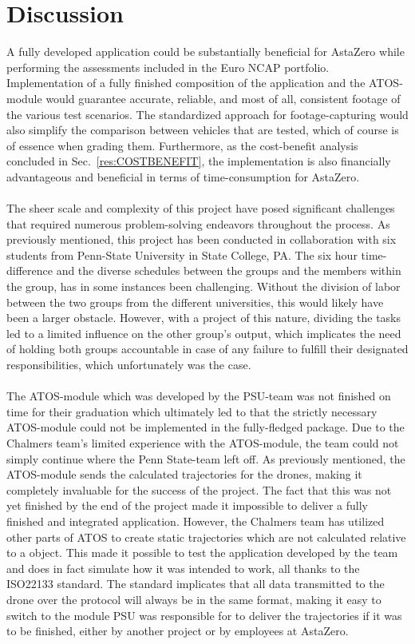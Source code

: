 \chapter{Discussion} \label{sec:discussion}

A fully developed application could be substantially beneficial for AstaZero while performing the assessments included in the Euro NCAP portfolio. Implementation of a fully finished composition of the application and the ATOS-module would guarantee accurate, reliable, and most of all, consistent footage of the various test scenarios. The standardized approach for footage-capturing would also simplify the comparison between vehicles that are tested, which of course is of essence when grading them. Furthermore, as the cost-benefit analysis concluded in Sec.~\ref{res:COSTBENEFIT}, the implementation is also financially advantageous and beneficial in terms of time-consumption for AstaZero. 
\\ \\
The sheer scale and complexity of this project have posed significant challenges that required numerous problem-solving endeavors throughout the process. As previously mentioned, this project has been conducted in collaboration with six students from Penn-State University in State College, PA. The six hour time-difference and the diverse schedules between the groups and the members within the group, has in some instances been challenging. Without the division of labor between the two groups from the different universities, this would likely have been a larger obstacle. However, with a project of this nature, dividing the tasks led to a limited influence on the other group's output, which implicates the need of holding both groups accountable in case of any failure to fulfill their designated responsibilities, which unfortunately was the case. 
\\ \\
The ATOS-module which was developed by the PSU-team was not finished on time for their graduation which ultimately led to that the strictly necessary ATOS-module could not be implemented in the fully-fledged package. Due to the Chalmers team's limited experience with the ATOS-module, the team could not simply continue where the Penn State-team left off. As previously mentioned, the ATOS-module sends the calculated trajectories for the drones, making it completely invaluable for the success of the project. The fact that this was not yet finished by the end of the project made it impossible to deliver a fully finished and integrated application. However, the Chalmers team has utilized other parts of ATOS to create static trajectories which are not calculated relative to a object. This made it possible to test the application developed by the team and does in fact simulate how it was intended to work, all thanks to the ISO22133 standard. The standard implicates that all data transmitted to the drone over the protocol will always be in the same format, making it easy to switch to the module PSU was responsible for to deliver the trajectories if it was to be finished, either by another project or by employees at AstaZero.
